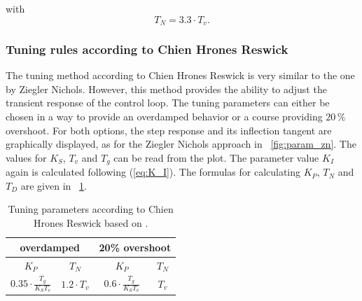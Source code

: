 with
\begin{equation}
    T_{N}  = 3.3\cdot T_{v}.
 \label{eq:T_N_zn}
\end{equation}

\subsubsection{Tuning rules according to Chien Hrones Reswick}\label{chap:CHR}
The tuning method according to Chien Hrones Reswick is very similar to the one by Ziegler Nichols. However, this method provides the ability to adjust the transient response of the control loop. The tuning parameters can either be chosen in a way to provide an overdamped behavior or a course providing $20\, \%$ overshoot. \cite{Reg_11}
For both options, the step response and its inflection tangent are graphically displayed, as for the Ziegler Nichols approach in \figurename~\ref{fig:param_zn}.
The values for $K_{S}$, $T_{v}$ and $T_{g}$ can be read from the plot. The parameter value $K_{I}$ again is calculated following (\ref{eq:K_I}). The formulas for calculating  $K_{P}$,  $T_{N}$ and $T_{D}$ are given in \tablename~\ref{tab:param_chr}.

\begin{table}[h]
  \centering
  \begin{tabular}{cc|cc}
    \toprule
     \multicolumn{2}{c|}{overdamped} & \multicolumn{2}{c}{20\% overshoot} \\
    \midrule
    $K_{P}$ &  $T_{N}$ & $K_{P}$ &  $T_{N}$ \\
    \midrule
     $0.35 \cdot \frac{T_{g}}{K_{S}T_{v}}$ & $1.2 \cdot T_{v}$  & $0.6 \cdot \frac{T_{g}}{K_{S}T_{v}}$ & $T_{v}$ \\
    \bottomrule
\end{tabular}
  \caption[Tuning parameters Chien Hrones Reswick]{Tuning parameters according to Chien Hrones Reswick based on \cite{Reg_17}.}
  \label{tab:param_chr}
\end{table}

